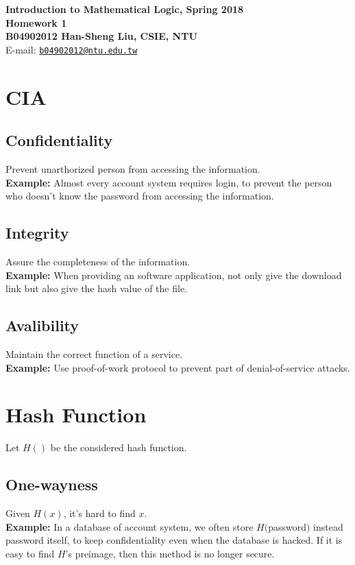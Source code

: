 \documentclass[12pt,a4paper]{article}
\begin{document}
\begin{center}
\textbf{\Large Introduction to Mathematical Logic, Spring 2018\\}
\textbf{\Large Homework 1\\} 
\vspace{5pt}
\textbf{B04902012 Han-Sheng Liu, CSIE, NTU}\\
E-mail: \href{mailto:b04902012@ntu.edu.tw}{\texttt{b04902012@ntu.edu.tw}}\\

\end{center}
\vspace{5pt}
\section{CIA}
\subsection{Confidentiality}
    Prevent unarthorized person from accessing the information.\\
    \textbf{Example:} Almost every account system requires login, to prevent the person who doesn't know the password from accessing the information.

\subsection{Integrity}
    Assure the completeness of the information.\\
    \textbf{Example:} When providing an software application, not only give the download link but also give the hash value of the file.

\subsection{Avalibility}
    Maintain the correct function of a service.\\
    \textbf{Example:} Use proof-of-work protocol to prevent part of denial-of-service attacks.

\section{Hash Function}
Let $H()$ be the considered hash function.
\subsection{One-wayness}
    Given $H(x)$, it's hard to find $x$.\\
    \textbf{Example:} In a database of account system, we often store $H($password$)$ instead password itself, to keep confidentiality even when the database is hacked. If it is easy to find $H$'s preimage, then this method is no longer secure. 
\end{document}
